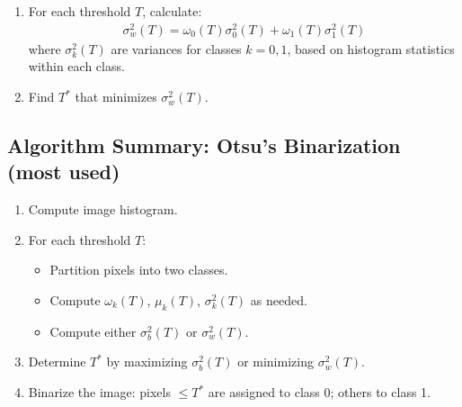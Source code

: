 \begin{enumerate}
    \item For each threshold $T$, calculate:
    \begin{align*}
        \sigma_w^2(T) = \omega_0(T) \sigma_0^2(T) + \omega_1(T) \sigma_1^2(T)
    \end{align*}
    where $\sigma_k^2(T)$ are variances for classes $k=0,1$, based on histogram statistics within each class.
    \item Find $T^*$ that minimizes $\sigma_w^2(T)$.
\end{enumerate}


\subsection{Algorithm Summary: Otsu’s Binarization (most used)}

\begin{enumerate}
    \item Compute image histogram.
    \item For each threshold $T$:
    \begin{itemize}
        \item Partition pixels into two classes.
        \item Compute $\omega_k(T)$, $\mu_k(T)$, $\sigma_k^2(T)$ as needed.
        \item Compute either $\sigma_b^2(T)$ or $\sigma_w^2(T)$.
    \end{itemize}
    \item Determine $T^*$ by maximizing $\sigma_b^2(T)$ or minimizing $\sigma_w^2(T)$.
    \item Binarize the image: pixels $\leq T^*$ are assigned to class 0; others to class 1.
\end{enumerate}

